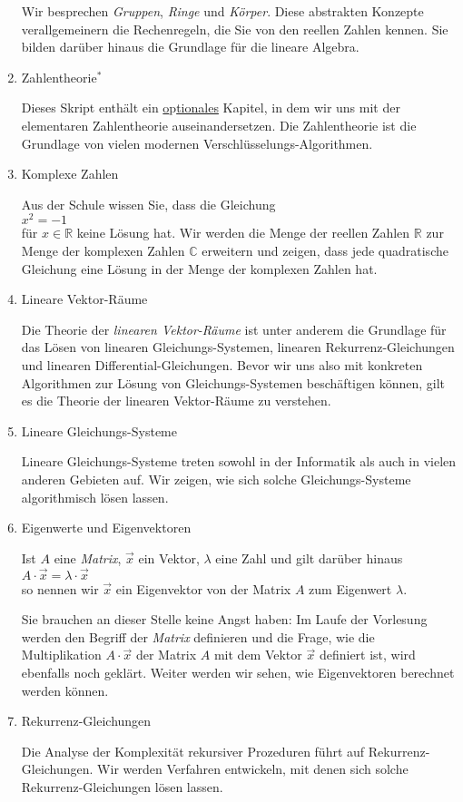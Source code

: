 \begin{enumerate}
      Wir besprechen \emph{Gruppen}, \emph{Ringe} und \emph{K\"{o}rper}.  Diese abstrakten Konzepte
      verallgemeinern  die Rechenregeln, die Sie von den reellen Zahlen kennen.  Sie bilden dar\"{u}ber
      hinaus die Grundlage f\"{u}r die lineare Algebra.
\item Zahlentheorie$^*$
  
      Dieses Skript enth\"{a}lt ein \underline{o}p\underline{tionales} Kapitel, in dem wir uns mit der 
      elementaren Zahlentheorie auseinandersetzen.  Die Zahlentheorie ist die Grundlage
      von vielen modernen Verschl\"{u}sselungs-Algorithmen.
\item Komplexe Zahlen

      Aus der Schule wissen Sie, dass die Gleichung
      \\[0.2cm]
      \hspace*{1.3cm}
      $x^2 = -1$
      \\[0.2cm]
      f\"{u}r $x \in \mathbb{R}$ keine L\"{o}sung hat.  Wir werden die Menge der reellen Zahlen $\mathbb{R}$
      zur Menge der komplexen Zahlen $\mathbb{C}$ erweitern und zeigen, dass jede quadratische
      Gleichung eine L\"{o}sung in der Menge der komplexen Zahlen hat.
\item Lineare Vektor-R\"{a}ume

      Die Theorie der \emph{linearen Vektor-R\"{a}ume} ist unter anderem die Grundlage f\"{u}r das L\"{o}sen von linearen
      Gleichungs-Systemen, linearen Rekurrenz-Gleichungen und linearen Differential-Gleichungen.
      Bevor wir uns also mit konkreten Algorithmen zur L\"{o}sung von Gleichungs-Systemen besch\"{a}ftigen
      k\"{o}nnen, gilt es die Theorie der linearen Vektor-R\"{a}ume zu verstehen.
\item Lineare Gleichungs-Systeme

      Lineare Gleichungs-Systeme treten sowohl in der Informatik als auch in vielen anderen Gebieten auf. 
      Wir zeigen, wie sich solche Gleichungs-Systeme algorithmisch l\"{o}sen lassen.
\item Eigenwerte und Eigenvektoren

      Ist $A$ eine \emph{Matrix},  $\vec{x}$ ein Vektor, $\lambda$ eine Zahl und gilt dar\"{u}ber hinaus
      \\[0.2cm]
      \hspace*{1.3cm}
      $A \cdot \vec{x} = \lambda \cdot \vec{x}$
      \\[0.2cm]
      so nennen wir $\vec{x}$ ein Eigenvektor von der Matrix $A$ zum Eigenwert $\lambda$.
      
      Sie brauchen an dieser Stelle keine Angst haben: Im Laufe der Vorlesung werden den Begriff der
      \emph{Matrix} definieren  und die Frage, wie die Multiplikation $A \cdot \vec{x}$ der Matrix $A$ mit
      dem Vektor $\vec{x}$ definiert ist, wird ebenfalls noch gekl\"{a}rt.  Weiter werden wir sehen,
      wie Eigenvektoren berechnet werden k\"{o}nnen.
\item Rekurrenz-Gleichungen

      Die Analyse der Komplexit\"{a}t rekursiver Prozeduren f\"{u}hrt auf Rekurrenz-Gleichungen.
      Wir werden Verfahren entwickeln, mit denen sich solche Rekurrenz-Gleichungen l\"{o}sen lassen.
\end{enumerate}
